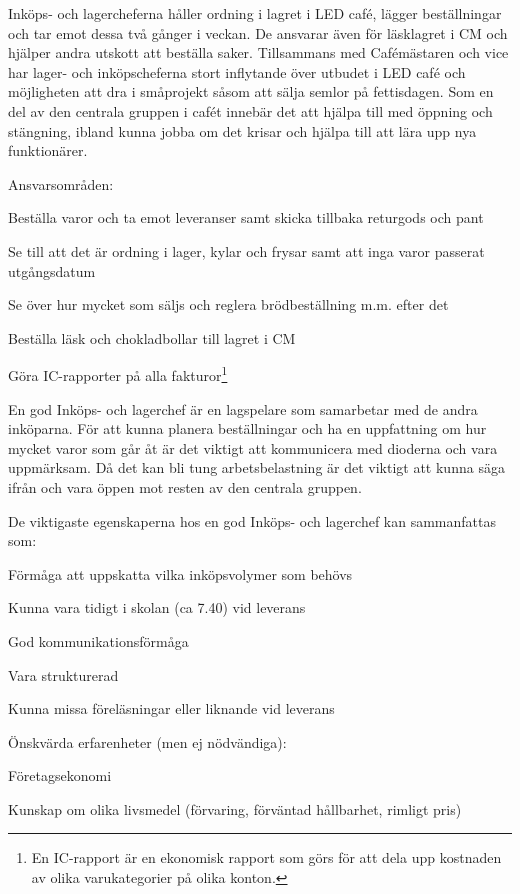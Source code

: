 \documentclass[10pt]{article}
\def\post{Inköps- och lagerchef}
\def\doctitle{Kravprofil för \post}
\begin{document}
\heading{\doctitle}


{\post}erna håller ordning i lagret i LED café, lägger beställningar och tar emot dessa två gånger i veckan. De ansvarar även för läsklagret i CM och hjälper andra utskott att beställa saker. Tillsammans med Cafémästaren och vice har lager- och inköpscheferna stort inflytande över utbudet i LED café och möjligheten att dra i småprojekt såsom att sälja semlor på fettisdagen. Som en del av den centrala gruppen i cafét innebär det att hjälpa till med öppning och stängning, ibland kunna jobba om det krisar och hjälpa till att lära upp nya funktionärer.

Ansvarsområden:
\begin{dashlist}
    \item Beställa varor och ta emot leveranser samt skicka tillbaka returgods och pant
    \item Se till att det är ordning i lager, kylar och frysar samt att inga varor passerat utgångsdatum
    \item Se över hur mycket som säljs och reglera brödbeställning m.m. efter det
    \item Beställa läsk och chokladbollar till lagret i CM
    \item Göra IC-rapporter på alla fakturor\footnote{En IC-rapport är en ekonomisk rapport som görs för att dela upp kostnaden av olika varukategorier på olika konton.}
\end{dashlist}
    
    
En god {\post} är en lagspelare som samarbetar med de andra inköparna. För att kunna planera beställningar och ha en uppfattning om hur mycket varor som går åt är det viktigt att kommunicera med dioderna och vara uppmärksam. Då det kan bli tung arbetsbelastning är det viktigt att kunna säga ifrån och vara öppen mot resten av den centrala gruppen.


De viktigaste egenskaperna hos en god {\post} kan sammanfattas som:
\begin{dashlist}
    \item Förmåga att uppskatta vilka inköpsvolymer som behövs
    \item Kunna vara tidigt i skolan (ca 7.40)  vid leverans
    \item God kommunikationsförmåga
    \item Vara strukturerad
    \item Kunna missa föreläsningar eller liknande vid leverans
\end{dashlist}


Önskvärda erfarenheter (men ej nödvändiga):
\begin{dashlist}
    \item Företagsekonomi
    \item Kunskap om olika livsmedel (förvaring, förväntad hållbarhet, rimligt pris)
\end{dashlist}
\end{document}
